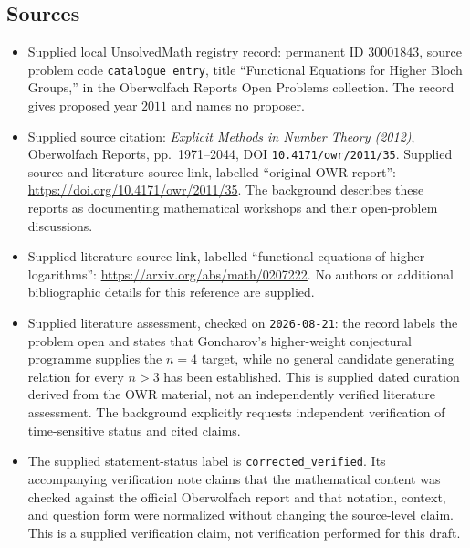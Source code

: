 \documentclass[11pt]{article}
\begin{document}
\subsection{Sources}
\begin{itemize}
\item Supplied local UnsolvedMath registry record: permanent ID \(30001843\), source problem code \texttt{catalogue entry}, title ``Functional Equations for Higher Bloch Groups,'' in the Oberwolfach Reports Open Problems collection. The record gives proposed year \(2011\) and names no proposer.
\item Supplied source citation: \emph{Explicit Methods in Number Theory (2012)}, Oberwolfach Reports, pp.\ 1971--2044, DOI \texttt{10.4171/owr/2011/35}. Supplied source and literature-source link, labelled ``original OWR report'': \url{https://doi.org/10.4171/owr/2011/35}. The background describes these reports as documenting mathematical workshops and their open-problem discussions.
\item Supplied literature-source link, labelled ``functional equations of higher logarithms'': \url{https://arxiv.org/abs/math/0207222}. No authors or additional bibliographic details for this reference are supplied.
\item Supplied literature assessment, checked on \texttt{2026-08-21}: the record labels the problem open and states that Goncharov's higher-weight conjectural programme supplies the \(n=4\) target, while no general candidate generating relation for every \(n>3\) has been established. This is supplied dated curation derived from the OWR material, not an independently verified literature assessment. The background explicitly requests independent verification of time-sensitive status and cited claims.
\item The supplied statement-status label is \texttt{corrected\_verified}. Its accompanying verification note claims that the mathematical content was checked against the official Oberwolfach report and that notation, context, and question form were normalized without changing the source-level claim. This is a supplied verification claim, not verification performed for this draft.
\end{itemize}
\end{document}
